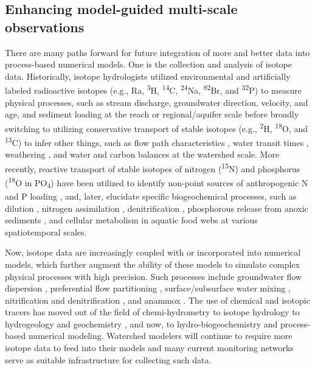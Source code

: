 \documentclass[preprint,review, 12pt]{elsarticle}
\begin{document}
\subsection{Enhancing model-guided multi-scale observations}
    There are many paths forward for future integration of more and better data into process-based numerical models. One is the collection and analysis of isotope data. Historically, isotope hydrologists utilized environmental and artificially labeled radioactive isotopes (e.g., Ra, \textsuperscript{3}H, \textsuperscript{14}C, \textsuperscript{24}Na, \textsuperscript{82}Br, and \textsuperscript{32}P) to measure physical processes, such as stream discharge, groundwater direction, velocity, and age, and sediment loading at the reach or regional/aquifer scale \citep{Joly1922, Agency1963, Agency1967} before broadly switching to utilizing conservative transport of stable isotopes (e.g., \textsuperscript{2}H, \textsuperscript{18}O, and \textsuperscript{13}C) to infer other things, such as flow path characteristics \citep{Klaus2013}, water transit times \citep{McGuire2006}, weathering \citep{Schulte2011}, and water \citep{Agency} and carbon \citep{Dawson2011} balances at the watershed scale. More recently, reactive transport of stable isotopes of nitrogen (\textsuperscript{15}N) and phosphorus (\textsuperscript{18}O in PO\textsubscript{4}) have been utilized to identify non-point sources of anthropogenic N \citep{Fry1999, Lake2001, Spoelstra2001, Robinson2001, Mayer2002, M.JakeVanderZanden2005, Kendall2008, Savard2010, Nestler2011, Kaushal2011} and P loading \citep{McLaughlin2006, Elsbury2009, Paytan2012, Granger2017, Tonderski2017, Ishida2019}, and, later, elucidate specific biogeochemical processes, such as dilution \citep{Archana2018}, nitrogen assimilation \citep{Deutsch2009, Nikolenko2018}, denitrification \citep{Wexler2014}, phosphorous release from anoxic sediments \citep{Elsbury2009}, and cellular metabolism in aquatic food webs \citep{Davies2014} at various spatiotemporal scales.
            
    Now, isotope data are increasingly coupled with or incorporated into numerical models, which further augment the ability of these models to simulate complex physical processes with high precision. Such processes include groundwater flow dispersion \citep{Cornaton2011, Jiang2019}, preferential flow partitioning \citep{VanderHoven2002, Dusek2018}, surface/subsurface water mixing \citep{Turner2006}, nitrification and denitrification \citep{Choi2003, Chen2004, Rutting2007}, and anammox \citep{Granger2016}. The use of chemical and isotopic tracers has moved out of the field of chemi-hydrometry \citep{Groat1915} to isotope hydrology \citep{Agency} to hydrogeology and geochemistry \citep{Agency1974}, and now, to hydro-biogeochemistry and process-based numerical modeling.  Watershed modelers will continue to require more isotope data to feed into their models and many current monitoring networks serve as suitable infrastructure for collecting such data. 
\end{document}
